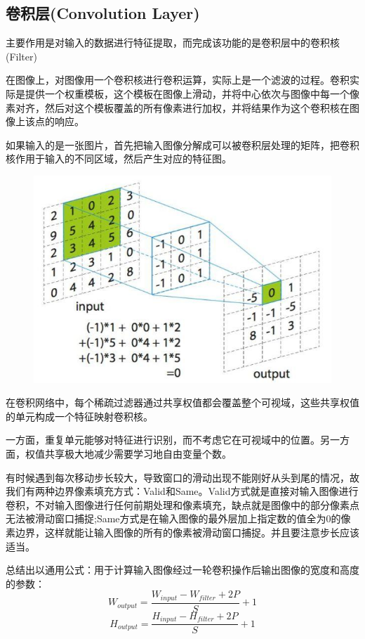 \documentclass[openbib]{article}
\begin{document}
\subsection{卷积层(Convolution Layer)}

主要作用是对输入的数据进行特征提取，而完成该功能的是卷积层中的卷积核(Filter)

在图像上，对图像用一个卷积核进行卷积运算，实际上是一个滤波的过程。卷积实际是提供一个权重模板，这个模板在图像上滑动，并将中心依次与图像中每一个像素对齐，然后对这个模板覆盖的所有像素进行加权，并将结果作为这个卷积核在图像上该点的响应。

如果输入的是一张图片，首先把输入图像分解成可以被卷积层处理的矩阵，把卷积核作用于输入的不同区域，然后产生对应的特征图。

\begin{figure}[htbp]
	\centering
	\includegraphics[scale=0.3]{卷积运算.jpg}
\end{figure}

在卷积网络中，每个稀疏过滤器通过共享权值都会覆盖整个可视域，这些共享权值的单元构成一个特征映射卷积核。

一方面，重复单元能够对特征进行识别，而不考虑它在可视域中的位置。另一方面，权值共享极大地减少需要学习地自由变量个数。

有时候遇到每次移动步长较大，导致窗口的滑动出现不能刚好从头到尾的情况，故我们有两种边界像素填充方式：Valid和Same。Valid方式就是直接对输入图像进行卷积，不对输入图像进行任何前期处理和像素填充，缺点就是图像中的部分像素点无法被滑动窗口捕捉;Same方式是在输入图像的最外层加上指定数的值全为0的像素边界，这样就能让输入图像的所有的像素被滑动窗口捕捉。并且要注意步长应该适当。

总结出以通用公式：用于计算输入图像经过一轮卷积操作后输出图像的宽度和高度的参数：
$$W_{output}=\frac{W_{input}-W_{filter}+2P}{S}+1$$
$$H_{output}=\frac{H_{input}-H_{filter}+2P}{S}+1$$
\end{document}
